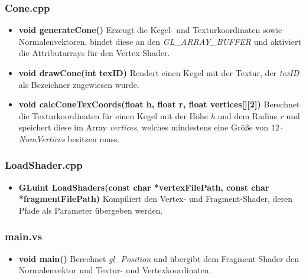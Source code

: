 \documentclass{scrartcl}
\begin{document}
            \subsubsection*{Cone.cpp}
                \begin{itemize}
                    \item \textbf{void generateCone()}
                        Erzeugt die Kegel- und Texturkoordinaten sowie Normalenvektoren, bindet diese an 
                        den \textit{GL\_ARRAY\_BUFFER} und aktiviert die Attributarrays für den Vertex-Shader.
                    \item \textbf{void drawCone(int texID)}
                        Rendert einen Kegel mit der Textur, der \textit{texID} als Bezeichner zugewiesen wurde.
                    \item \textbf{void calcConeTexCoords(float h, float r, float vertices[][2])}
                        Berechnet die Texturkoordinaten für einen Kegel mit der Höhe \textit{h} und dem Radius 
                        \textit{r} und speichert diese im Array \textit{vertices}, welches mindestens eine Größe von 
                        $12 \cdot$ \textit{NumVertices} besitzen muss.
                \end{itemize}
            \subsubsection*{LoadShader.cpp}
                \begin{itemize}
                \item \textbf{GLuint LoadShaders(const char *vertexFilePath, const char *fragmentFilePath)}
                    Kompiliert den Vertex- und Fragment-Shader, deren Pfade als Parameter übergeben werden.
                \end{itemize}
            \subsubsection*{main.vs}
                \begin{itemize}
                \item \textbf{void main()}
                    Berechnet \textit{gl\_Position} und übergibt dem Fragment-Shader den Normalenvektor 
                    und Textur- und Vertexkoordinaten.
                \end{itemize}
\end{document}
